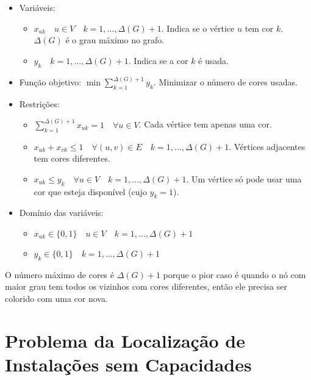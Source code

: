 \begin{itemize}
    \item Variáveis:
    \begin{itemize}
        \item $x_{uk} \quad u \in V \quad k = 1,\dots,\Delta(G)+1$. Indica se o vértice $u$ tem cor $k$. $\Delta(G)$ é o grau máximo no grafo.
        \item $y_k \quad k=1,\dots,\Delta(G)+1$. Indica se a cor $k$ é usada.
    \end{itemize}
    \item Função objetivo: $\min\sum_{k=1}^{\Delta(G)+1}y_k$. Minimizar o número de cores usadas.
    \item Restrições:
    \begin{itemize}
        \item $\sum_{k=1}^{\Delta(G)+1} x_{uk} = 1 \quad \forall u\in V$. Cada vértice tem apenas uma cor.
        \item $x_{uk}+x_{vk} \leq 1 \quad \forall (u,v) \in E \quad k=1,\dots,\Delta(G)+1$. Vértices adjacentes tem cores diferentes.
        \item $x_{uk} \leq y_k \quad \forall u \in V \quad k=1,\dots,\Delta(G)+1$. Um vértice só pode usar uma cor que esteja disponível (cujo $y_k=1$).
    \end{itemize}
    \item Domínio das variáveis:
    \begin{itemize}
        \item $x_{uk} \in \{0, 1\} \quad u \in V \quad k = 1,\dots,\Delta(G)+1$
        \item $y_k \in \{0,1\} \quad k = 1,\dots,\Delta(G)+1$
    \end{itemize}
\end{itemize}

O número máximo de cores é $\Delta(G) + 1$ porque o pior caso é quando o nó com maior grau tem todos os vizinhos com cores diferentes, então ele precisa ser colorido com uma cor nova.

\section{Problema da Localização de Instalações sem Capacidades}

